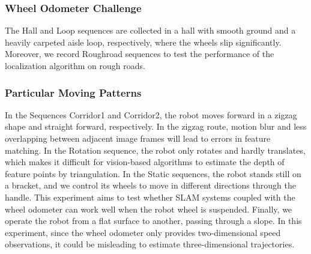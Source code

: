 \documentclass[conference]{IEEEtran}
\begin{document}
	
	\subsubsection{Wheel Odometer Challenge}
	The Hall and Loop sequences are collected in a hall with smooth ground and a heavily carpeted aisle loop, respectively, where the wheels slip significantly. Moreover, we record Roughroad sequences to test the performance of the localization algorithm on rough roads.

	
	\subsubsection{Particular Moving Patterns}
	
    In the Sequences Corridor1 and Corridor2, the robot moves forward in a zigzag shape and straight forward, respectively. In the zigzag route, motion blur and less overlapping between adjacent image frames will lead to errors in feature matching. 
    In the Rotation sequence, the robot only rotates and hardly translates, which makes it difficult for vision-based algorithms to estimate the depth of feature points by triangulation. In the Static sequences, the robot stands still on a bracket, and we control its wheels to move in different directions through the handle. This experiment aims to test whether SLAM systems coupled with the wheel odometer can work well when the robot wheel is suspended.
	Finally, we operate the robot from a flat surface to another, passing through a slope. In this experiment, since the wheel odometer only provides two-dimensional speed observations, it could be misleading to estimate three-dimensional trajectories.


	
	
\end{document}
